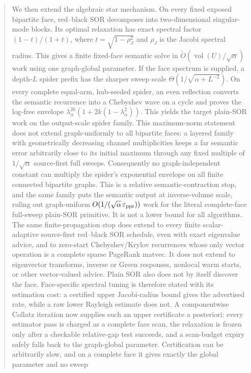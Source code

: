 \documentclass[11pt]{article}
\begin{document}
\begin{abstract}
We then extend the algebraic star mechanism.  On every fixed exposed
bipartite face, red--black SOR decomposes into two-dimensional singular-mode
blocks.  Its optimal relaxation has exact spectral factor
$(1-t)/(1+t)$, where $t=\sqrt{1-\rho_J^2}$ and $\rho_J$ is the Jacobi spectral
radius.  This gives a finite fixed-face semantic solve in
$\widetilde O(\operatorname{vol}(U)/\sqrt\alpha)$ work using one graph-global
parameter.  If the face spectrum is supplied, a depth-$L$ spider prefix has
the sharper sweep scale
$\Theta(1/\sqrt{\alpha+L^{-2}})$.  On every complete equal-arm,
hub-seeded spider, an even reflection converts the semantic recurrence into
a Chebyshev wave on a cycle and proves the log-free envelope
$\lambda_\alpha^{2k}(1+2k(1-\lambda_\alpha^2))$.  This yields the target
plain-SOR work on the output-scale spider family.  This maximum-norm statement
does not extend graph-uniformly to all bipartite faces: a layered family with
geometrically decreasing channel multiplicities keeps a far semantic error
arbitrarily close to its initial maximum through any fixed multiple of
$1/\sqrt\alpha$ source-first full sweeps.  Consequently no graph-independent
constant can multiply the spider's exponential envelope on all finite
connected bipartite graphs.  This is a relative semantic-contraction stop,
and the same family puts the semantic output at inverse-volume scale, ruling
out graph-uniform $O(1/(\sqrt\alpha\,\varepsilon_{\rm ppr}))$ work for the
literal complete-face full-sweep plain-SOR primitive.  It is not a lower bound
for all algorithms.  The same finite-propagation stop does extend to every
finite scalar-adaptive source-first red--black SOR schedule, even with exact
eigenvalue advice, and to zero-start Chebyshev/Krylov recurrences whose only
vector operation is a complete sparse PageRank matvec.  It does not extend to
eigenvector transforms, inverse or Green responses, nonlocal warm starts, or
other vector-valued advice.  Plain SOR also does not by itself discover the
face.  Face-specific spectral tuning is therefore stated with its estimation
cost: a certified upper Jacobi-radius bound gives the advertised rate, while
a raw lower Rayleigh estimate does not.  A componentwise Collatz iteration
now supplies such an upper certificate a posteriori: every estimator pass is
charged as a complete face scan, the relaxation is frozen only after a
checkable relative-gap test succeeds, and a scan-budget expiry safely falls
back to the graph-global parameter.  Certification can be arbitrarily slow,
and on a complete face it gives exactly the global parameter and no sweep

\end{abstract}
\end{document}
